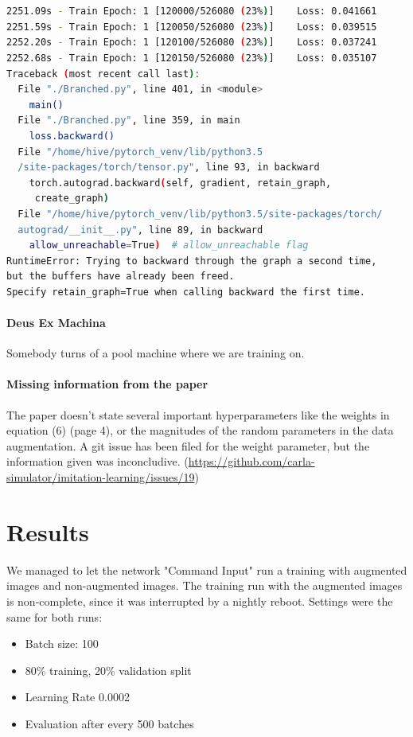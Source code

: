 \documentclass[a4paper]{article}
\begin{document}
\begin{lstlisting}[language=bash, caption={Nigthly Reboot Interruption}]


2251.09s - Train Epoch: 1 [120000/526080 (23%)]    Loss: 0.041661
2251.59s - Train Epoch: 1 [120050/526080 (23%)]    Loss: 0.039515
2252.20s - Train Epoch: 1 [120100/526080 (23%)]    Loss: 0.037241
2252.68s - Train Epoch: 1 [120150/526080 (23%)]    Loss: 0.035107
Traceback (most recent call last):
  File "./Branched.py", line 401, in <module>
    main()
  File "./Branched.py", line 359, in main
    loss.backward()
  File "/home/hive/pytorch_venv/lib/python3.5
  /site-packages/torch/tensor.py", line 93, in backward
    torch.autograd.backward(self, gradient, retain_graph,
     create_graph)
  File "/home/hive/pytorch_venv/lib/python3.5/site-packages/torch/
  autograd/__init__.py", line 89, in backward
    allow_unreachable=True)  # allow_unreachable flag
RuntimeError: Trying to backward through the graph a second time, 
but the buffers have already been freed. 
Specify retain_graph=True when calling backward the first time.

\end{lstlisting}

\paragraph{Deus Ex Machina} Somebody turns of a pool machine where we are
training on.

\paragraph{Missing information from the paper} The paper doesn't state several
important hyperparameters like the weights in equation (6) (page 4), or the
magnitudes of the random parameters in the data augmentation. A git issue has
been filed for the weight parameter, but the information given was inconcludive.
(\url{https://github.com/carla-simulator/imitation-learning/issues/19})

\section{Results}
We managed to let the network "Command Input" run a training with augmented images and non-augmented images.
The training run with the augmented images is non-complete, since it was interrupted by a nightly reboot.
Settings were the same for both runs:
\begin{itemize}
	\item Batch size: 100
	\item 80\% training, 20\% validation split
	\item Learning Rate 0.0002
	\item Evaluation after every 500 batches
  \end{itemize}
\end{document}
